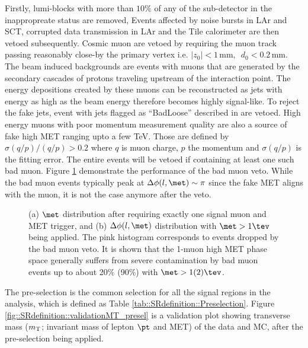 Firstly, lumi-blocks with more than $10\%$ of any of the sub-detector in the inappropreate status are removed, 
Events affected by noise bursts in LAr and SCT, corrupted data transmission in LAr and the Tile calorimeter are then vetoed subsequently. 
Cosmic muon are vetoed by requiring the muon track passing reasonably close-by the primary vertex i.e.
$|z_0| < 1\, \mathrm{mm}, \,\,\, d_0<0.2\, \mathrm{mm}$. 
The beam induced backgrounds are events with muons that are generated by the secondary cascades of protons traveling upstream of the interaction point. The energy depositions created by these muons can be reconstructed as jets with energy as high as the beam energy therefore becomes highly signal-like. To reject the fake jets, event with jets flagged as ``BadLoose'' described in \cite{BadJetCriteriaATLAS2015} are vetoed. 
High energy muons with poor momentum measurement quality are also a source of fake high MET ranging upto a few TeV.
Those are defined by $\sigma(q/p) / (q/p) > 0.2$ where $q$ is muon charge, $p$ the momentum and $\sigma(q/p)$ is the fitting error.
The entire events will be vetoed if containing at least one such bad muon. 
Figure \ref{fig::SRdefinition::badMuonVeto} demonstrate the performance of the bad muon veto. 
While the bad muon events typically peak at $\Delta \phi (l,\met) \sim \pi$ since the fake MET aligns with the muon, 
it is not the case anymore after the veto. \\


\begin{figure}[h]
  \centering
    \caption{(a) $\met$ distribution after requiring exactly one signal muon and MET trigger, and (b) $\Delta \phi (l,\met)$ distribution with $\met>1\tev$ being applied. The pink histogram corresponds to events dropped by the bad muon veto. It is shown that the 1-muon high MET phase space generally suffers from severe contamination by bad muon events up to about 20$\%$ (90$\%$) with  $\met>1(2)\tev$.}
    \label{fig::SRdefinition::badMuonVeto}
\end{figure}

The pre-selection is the common selection for all the signal regions in the analysis, which is defined as Table \ref{tab::SRdefinition::Preselection}. 
Figure \ref{fig::SRdefinition::validationMT_presel} is a validation plot showing transverse mass ($m_{\mathrm{T}}$; invariant mass of lepton $\pt$ and MET) of the data and MC, 
after the pre-selection being applied. \\

